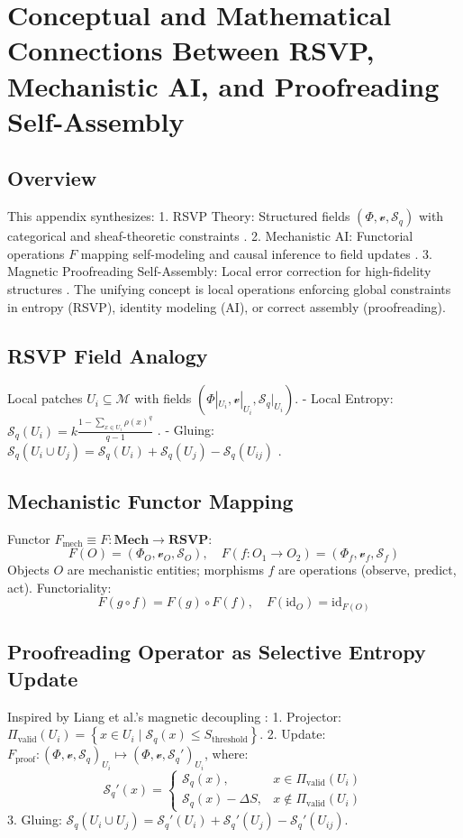 \documentclass{article}
\theoremstyle{plain}
\theoremstyle{definition}
\begin{document}
\FloatBarrier

\section{Conceptual and Mathematical Connections Between RSVP, Mechanistic AI, and Proofreading Self-Assembly}
\FloatBarrier
\subsection{Overview}
This appendix synthesizes:
1. RSVP Theory: Structured fields $(\Phi, \mathcal{v}, \mathcal{S}_q)$ with categorical and sheaf-theoretic constraints \cite{Soares2024}.
2. Mechanistic AI: Functorial operations $F$ mapping self-modeling and causal inference to field updates \cite{Bennett2025}.
3. Magnetic Proofreading Self-Assembly: Local error correction for high-fidelity structures \cite{Liang2025}.
The unifying concept is local operations enforcing global constraints in entropy (RSVP), identity modeling (AI), or correct assembly (proofreading).

\subsection{RSVP Field Analogy}
Local patches $U_i \subseteq \mathcal{M}$ with fields $(\Phi|_{U_i}, \mathcal{v}|_{U_i}, \mathcal{S}_q|_{U_i})$.
- Local Entropy: $\mathcal{S}_q(U_i) = k \frac{1 - \sum_{x \in U_i} \rho(x)^q}{q-1}$ \cite{Tsallis1988}.
- Gluing: $\mathcal{S}_q(U_i \cup U_j) = \mathcal{S}_q(U_i) + \mathcal{S}_q(U_j) - \mathcal{S}_q(U_{ij})$ \cite{MacLane1992}.

\subsection{Mechanistic Functor Mapping}
Functor $F_\text{mech} \equiv F: \mathbf{Mech} \to \mathbf{RSVP}$:
\[
F(O) = (\Phi_O, \mathcal{v}_O, \mathcal{S}_O), \quad F(f: O_1 \to O_2) = (\Phi_f, \mathcal{v}_f, \mathcal{S}_f)
\]
Objects $O$ are mechanistic entities; morphisms $f$ are operations (observe, predict, act). Functoriality:
\[
F(g \circ f) = F(g) \circ F(f), \quad F(\text{id}_O) = \text{id}_{F(O)}
\]

\subsection{Proofreading Operator as Selective Entropy Update}
Inspired by Liang et al.’s magnetic decoupling \cite{Liang2025}:
1. Projector: $\Pi_\text{valid}(U_i) = \left\{ x \in U_i \mid \mathcal{S}_q(x) \le S_\text{threshold} \right\}$.
2. Update: $F_\text{proof} : (\Phi, \mathcal{v}, \mathcal{S}_q)_{U_i} \mapsto (\Phi, \mathcal{v}, \mathcal{S}_q')_{U_i}$, where:
\[
\mathcal{S}_q'(x) = \begin{cases} \mathcal{S}_q(x), & x \in \Pi_\text{valid}(U_i) \\ \mathcal{S}_q(x) - \Delta S, & x \notin \Pi_\text{valid}(U_i) \end{cases}
\]
3. Gluing: $\mathcal{S}_q(U_i \cup U_j) = \mathcal{S}_q'(U_i) + \mathcal{S}_q'(U_j) - \mathcal{S}_q'(U_{ij})$.
\end{document}
